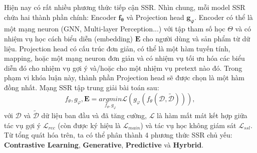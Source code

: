 Hiện nay có rất nhiều phương thức tiếp cận SSR. Nhìn chung, mỗi model SSR chứa hai thành phần \cite{survey:ssl-for-rec-sys} chính: Encoder $\bm{f_\theta}$ và Projection head $\bm{g_\varphi}$. Encoder có thể là một mạng neuron (GNN, Multi-layer Perception...) với tập tham số học $\Theta$ và có nhiệm vụ học cách biểu diễn (embedding) $\mathbf{E}$ cho người dùng và sản phẩm từ dữ liệu. Projection head có cấu trúc đơn giản, có thể là một hàm tuyến tính, mapping, hoặc một mạng neuron đơn giản và có nhiệm vụ tối ưu hóa các biểu diễn đó cho nhiệm vụ gợi ý và/hoặc cho một nhiệm vụ pretext nào đó. Trong phạm vi khóa luận này, thành phần Projection head sẽ được chọn là một hàm đồng nhất. Mạng SSR tập trung giải bài toán sau:
\begin{equation}
    f_\theta, g_\varphi, \mathbf{E} = \underset{f_\theta, g_\varphi}{arg min}\mathcal{L}\left(g_\varphi(f_\theta(\mathcal{D}, \tilde{\mathcal{D}}))\right),
\end{equation}
với $\mathcal{D}$ và $\tilde{\mathcal{D}}$ dữ liệu ban đầu và đã tăng cường, $\mathcal{L}$ là hàm mất mát kết hợp giữa tác vụ gợi ý $\mathcal{L}_\textit{rec}$ (còn được ký hiệu là $\mathcal{L}_\textit{main}$) và tác vụ học không giám sát $\mathcal{L}_\textit{ssl}$. Từ tổng quát hóa trên, ta có thể phân thành 4 phương thức \cite{survey:ssl-for-rec-sys} SSR chủ yếu: \textbf{Contrastive Learning}, \textbf{Generative}, \textbf{Predictive} và \textbf{Hyrbrid}.
